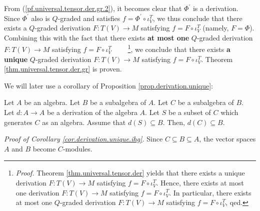 \documentclass[etingof-lie.tex]{subfiles}
\begin{document}
\begin{verlong}
From (\ref{pf.universal.tensor.der.gr.2}), it becomes clear that $\Phi
^{\prime}$ is a derivation. Since $\Phi^{\prime}$ also is $Q$-graded and
satisfies $f=\Phi^{\prime}\circ\iota_{V}^{T}$, we thus conclude that there
exists a $Q$-graded derivation $F:T\left(  V\right)  \rightarrow M$ satisfying
$f=F\circ\iota_{V}^{T}$ (namely, $F=\Phi$). Combining this with the fact that
there exists \textbf{at most one} $Q$-graded derivation $F:T\left(  V\right)
\rightarrow M$ satisfying $f=F\circ\iota_{V}^{T}$%
\ \ \ \ \footnote{\textit{Proof.} Theorem \ref{thm.universal.tensor.der}
yields that there exists a unique derivation $F:T\left(  V\right)  \rightarrow
M$ satisfying $f=F\circ\iota_{V}^{T}$. Hence, there exists at most one
derivation $F:T\left(  V\right)  \rightarrow M$ satisfying $f=F\circ\iota
_{V}^{T}$. In particular, there exists at most one $Q$-graded derivation
$F:T\left(  V\right)  \rightarrow M$ satisfying $f=F\circ\iota_{V}^{T}$,
qed.}, we conclude that there exists \textbf{a unique} $Q$-graded derivation
$F:T\left(  V\right)  \rightarrow M$ satisfying $f=F\circ\iota_{V}^{T}$.
Theorem \ref{thm.universal.tensor.der.gr} is proven.
\end{verlong}

We will later use a corollary of Proposition \ref{prop.derivation.unique}:

\begin{corollary}
\label{cor.derivation.unique.ihg}Let $A$ be an algebra. Let $B$ be a
subalgebra of $A$. Let $C$ be a subalgebra of $B$. Let $d:A\rightarrow A$ be a
derivation of the algebra $A$. Let $S$ be a subset of $C$ which generates $C$
as an algebra. Assume that $d\left(  S\right)  \subseteq B$. Then, $d\left(
C\right)  \subseteq B$.
\end{corollary}

\textit{Proof of Corollary \ref{cor.derivation.unique.ihg}.} Since $C\subseteq
B\subseteq A$, the vector spaces $A$ and $B$ become $C$-modules.
\end{document}
